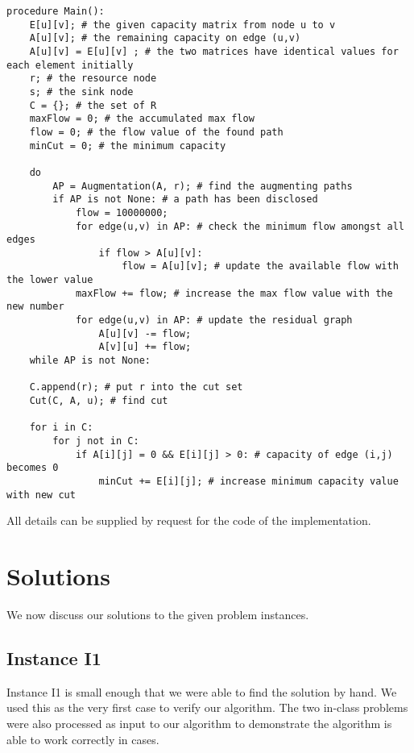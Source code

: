 \documentclass[11pt]{article}
\begin{document}
{\small
\begin{verbatim}procedure Main():
    E[u][v]; # the given capacity matrix from node u to v
    A[u][v]; # the remaining capacity on edge (u,v)
    A[u][v] = E[u][v] ; # the two matrices have identical values for each element initially
    r; # the resource node
    s; # the sink node
    C = {}; # the set of R
    maxFlow = 0; # the accumulated max flow
    flow = 0; # the flow value of the found path
    minCut = 0; # the minimum capacity

    do
        AP = Augmentation(A, r); # find the augmenting paths
        if AP is not None: # a path has been disclosed
            flow = 10000000;
            for edge(u,v) in AP: # check the minimum flow amongst all edges
                if flow > A[u][v]:
                    flow = A[u][v]; # update the available flow with the lower value
            maxFlow += flow; # increase the max flow value with the new number
            for edge(u,v) in AP: # update the residual graph
                A[u][v] -= flow;
                A[v][u] += flow;
    while AP is not None:

    C.append(r); # put r into the cut set
    Cut(C, A, u); # find cut

    for i in C:
        for j not in C:
            if A[i][j] = 0 && E[i][j] > 0: # capacity of edge (i,j) becomes 0
                minCut += E[i][j]; # increase minimum capacity value with new cut
\end{verbatim}
  }

All details can be supplied by request for the code of the implementation.
\section{Solutions}

We now discuss our solutions to the given problem instances.

\subsection{Instance I1}
Instance I1 is small enough that we were able to find the solution by hand. We used this as the very first case to verify our algorithm. The two in-class problems were also processed as input to our algorithm to demonstrate the algorithm is able to work correctly in cases.%
\end{document}
